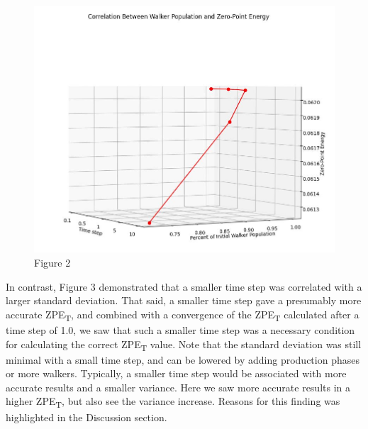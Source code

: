 \documentclass[journal=jacsat,manuscript=article]{achemso}
\begin{document}
\begin{figure}[H]
  \includegraphics[width=\linewidth]{fig_2.jpg}
  \caption{Figure 2}
  \label{fig:}
\end{figure}

In contrast, Figure 3 demonstrated that a smaller time step was correlated with a larger standard deviation. That said, a smaller time step gave a presumably more accurate ZPE\textsubscript{T}, and combined with a convergence of the ZPE\textsubscript{T} calculated after a time step of 1.0, we saw that such a smaller time step was a necessary condition for calculating the correct ZPE\textsubscript{T} value. Note that the standard deviation was still minimal with a small time step, and can be lowered by adding production phases or more walkers. Typically, a smaller time step would be associated with more accurate results and a smaller variance. Here we saw more accurate results in a higher ZPE\textsubscript{T}, but also see the variance increase. Reasons for this finding was highlighted in the Discussion section.
\end{document}
